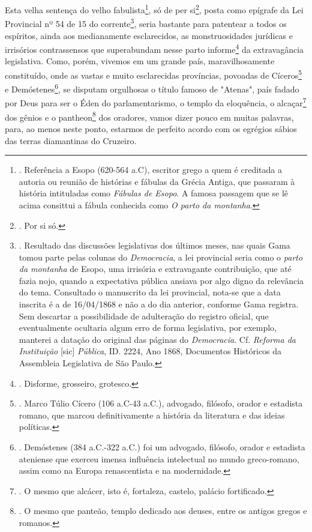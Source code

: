 Esta velha sentença do velho fabulista\footnote{. Referência a Esopo
  (620-564 a.C), escritor grego a quem é creditada a autoria ou reunião
  de histórias e fábulas da Grécia Antiga, que passaram à história
  intituladas como \emph{Fábulas de Esopo}. A famosa passagem que se lê
  acima consittui a fábula conhecida como \emph{O parto da montanha}.},
só de per si\footnote{. Por si só.}, posta como epígrafe da Lei
Provincial nº 54 de 15 do corrente\footnote{. Resultado das discussões
  legislativas dos últimos meses, nas quais Gama tomou parte pelas
  colunas do \emph{Democracia}, a lei provincial seria como o
  \emph{parto da montanha} de Esopo, uma irrisória e extravagante
  contribuição, que até fazia nojo, quando a expectativa pública ansiava
  por algo digno da relevância do tema. Consultado o manuscrito da lei
  provincial, nota-se que a data inscrita é a de 16/04/1868 e não a do
  dia anterior, conforme Gama registra. Sem descartar a possibilidade de
  adulteração do registro oficial, que eventualmente ocultaria algum
  erro de forma legislativa, por exemplo, manterei a datação do original
  das páginas do \emph{Democracia}. Cf. \emph{Reforma da Instituição}
  {[}sic{]} \emph{Pública}, ID. 2224, Ano 1868, Documentos Históricos da
  Assembleia Legislativa de São Paulo.}, seria bastante para patentear a
todos os espíritos, ainda aos medianamente esclarecidos, as
monstruosidades jurídicas e irrisórios contrassensos que superabundam
nesse parto informe\footnote{. Disforme, grosseiro, grotesco.} da
extravagância legislativa. Como, porém, vivemos em um grande país,
maravilhosamente constituído, onde as vastas e muito esclarecidas
províncias, povoadas de Cíceros\footnote{. Marco Túlio Cícero (106
  a.C-43 a.C.), advogado, filósofo, orador e estadista romano, que
  marcou definitivamente a história da literatura e das ideias
  políticas.} e Demóstenes\footnote{. Demóstenes (384 a.C.-322 a.C.) foi
  um advogado, filósofo, orador e estadista ateniense que exerceu imensa
  influência intelectual no mundo greco-romano, assim como na Europa
  renascentista e na modernidade.}, se disputam orgulhosas o título
famoso de "Atenas", país fadado por Deus para ser o Éden do
parlamentarismo, o templo da eloquência, o alcaçar\footnote{. O mesmo
  que alcácer, isto é, fortaleza, castelo, palácio fortificado.} dos
gênios e o pantheon\footnote{. O mesmo que panteão, templo dedicado aos
  deuses, entre os antigos gregos e romanos.} dos oradores, vamos dizer
pouco em muitas palavras, para, ao menos neste ponto, estarmos de
perfeito acordo com os egrégios sábios das terras diamantinas do
Cruzeiro.

